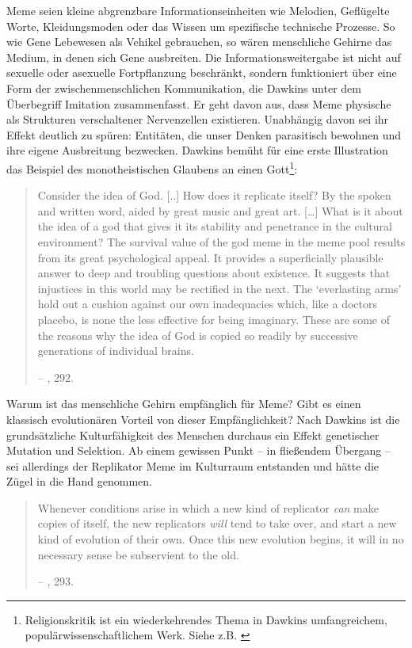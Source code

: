 \documentclass[openany,twoside,twocolumn]{book}
\let\rmarkdownfootnote\footnote%
\def\footnote{\protect\rmarkdownfootnote}
\begin{document}
Meme seien kleine abgrenzbare Informationseinheiten wie Melodien,
Geflügelte Worte, Kleidungsmoden oder das Wissen um spezifische
technische Prozesse. So wie Gene Lebewesen als Vehikel gebrauchen, so
wären menschliche Gehirne das Medium, in denen sich Gene ausbreiten. Die
Informationsweitergabe ist nicht auf sexuelle oder asexuelle
Fortpflanzung beschränkt, sondern funktioniert über eine Form der
zwischenmenschlichen Kommunikation, die Dawkins unter dem Überbegriff
Imitation zusammenfasst. Er geht davon aus, dass Meme physische als
Strukturen verschaltener Nervenzellen existieren. Unabhängig davon sei
ihr Effekt deutlich zu spüren: Entitäten, die unser Denken parasitisch
bewohnen und ihre eigene Ausbreitung bezwecken. Dawkins bemüht für eine
erste Illustration das Beispiel des monotheistischen Glaubens an einen
Gott\footnote{Religionskritik ist ein wiederkehrendes Thema in Dawkins
  umfangreichem, populärwissenschaftlichem Werk. Siehe z.B.
  \textcite{dawkins_god_2006}}:

\begin{quote}
Consider the idea of God. {[}..{]} How does it replicate itself? By the
spoken and written word, aided by great music and great art.
{[}\ldots{}{]} What is it about the idea of a god that gives it its
stability and penetrance in the cultural environment? The survival value
of the god meme in the meme pool results from its great psychological
appeal. It provides a superficially plausible answer to deep and
troubling questions about existence. It suggests that injustices in this
world may be rectified in the next. The `everlasting arms' hold out a
cushion against our own inadequacies which, like a doctors placebo, is
none the less effective for being imaginary. These are some of the
reasons why the idea of God is copied so readily by successive
generations of individual brains.

-- \textcite{Dawkinsselfishgene40th2016}, 292.
\end{quote}

Warum ist das menschliche Gehirn empfänglich für Meme? Gibt es einen
klassisch evolutionären Vorteil von dieser Empfänglichkeit? Nach Dawkins
ist die grundsätzliche Kulturfähigkeit des Menschen durchaus ein Effekt
genetischer Mutation und Selektion. Ab einem gewissen Punkt -- in
fließendem Übergang -- sei allerdings der Replikator Meme im Kulturraum
entstanden und hätte die Zügel in die Hand genommen.

\begin{quote}
Whenever conditions arise in which a new kind of replicator \emph{can}
make copies of itself, the new replicators \emph{will} tend to take
over, and start a new kind of evolution of their own. Once this new
evolution begins, it will in no necessary sense be subservient to the
old.

-- \textcite{Dawkinsselfishgene40th2016}, 293.
\end{quote}
\end{document}
